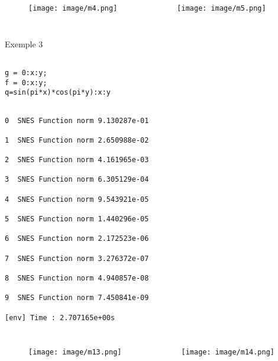 \documentclass[11pt]{beamer}
\begin{document}


\begin{frame}
\begin{columns}
\begin{figure}
\texttt{[image: image/m4.png]}
\end{figure}
\begin{figure}
\texttt{[image: image/m5.png]}
\end{figure}
\end{columns}
\end{frame}


\begin{frame}{Exemple 3}

\begin{verbatim}

g = 0:x:y; 
f = 0:x:y; 
q=sin(pi*x)*cos(pi*y):x:y
\end{verbatim}


\begin{verbatim}

0  SNES Function norm 9.130287e-01

1  SNES Function norm 2.650988e-02

2  SNES Function norm 4.161965e-03

3  SNES Function norm 6.305129e-04

4  SNES Function norm 9.543921e-05

5  SNES Function norm 1.440296e-05

6  SNES Function norm 2.172523e-06

7  SNES Function norm 3.276372e-07

8  SNES Function norm 4.940857e-08

9  SNES Function norm 7.450841e-09

[env] Time : 2.707165e+00s
\end{verbatim}


\end{frame}



\begin{frame}
\begin{columns}
\begin{figure}
\texttt{[image: image/m13.png]}
\end{figure}
\begin{figure}
\texttt{[image: image/m14.png]}
\end{figure}
\end{columns}
\end{frame}
\end{document}
